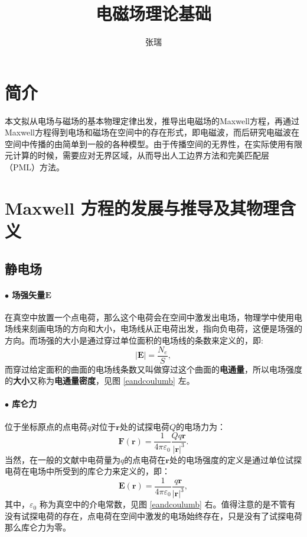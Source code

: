 \documentclass[10pt,reqno, final]{ctexart}
\begin{document}
\title{电磁场理论基础}
\author{张\quad 瑞}
\maketitle
\section{简介}
本文拟从电场与磁场的基本物理定律出发，推导出电磁场的Maxwell方程，再通过Maxwell方程得到电场和磁场在空间中的存在形式，即电磁波，而后研究电磁波在空间中传播的由简单到一般的各种模型。由于传播空间的无界性，在实际使用有限元计算的时候，需要应对无界区域，从而导出人工边界方法和完美匹配层 （PML）方法。

\section{Maxwell 方程的发展与推导及其物理含义}
\subsection{静电场}
\paragraph{$\bullet$ 场强矢量$\bm{E}$}在真空中放置一个点电荷，那么这个电荷会在空间中激发出电场，物理学中使用电场线来刻画电场的方向和大小，电场线从正电荷出发，指向负电荷，这便是场强的方向。而场强的大小是通过穿过单位面积的电场线的条数来定义的，即:
\begin{equation}\label{electricfield}
|\bm{E}|=\frac{N_e}{S},
\end{equation}
而穿过给定面积的曲面的电场线条数又叫做穿过这个曲面的\textbf{电通量}，所以电场强度的\textbf{大小}又称为\textbf{电通量密度}，见图 \ref{eandcoulumb} 左。
\paragraph{$\bullet$ 库仑力}位于坐标原点的点电荷$q$对位于$\bm{r}$处的试探电荷$Q$的电场力为：
\begin{equation}\label{coulombforce}
\bm{F}(\bm{r}) = \frac{1}{4\pi\varepsilon_0}\frac{Qq\bm{r}}{|\bm{r}|^3}.
\end{equation}
当然，在一般的文献中电荷量为$q$的点电荷在$\bm{r}$处的电场强度的定义是通过单位试探电荷在电场中所受到的库仑力来定义的，即：
\begin{equation}\label{columb}
\bm{E}(\bm{r})=\frac{1}{4\pi\varepsilon_0}\frac{q\bm{r}}{|\bm{r}|^3},
\end{equation}
其中，$\varepsilon_0$ 称为真空中的介电常数，见图 \ref{eandcoulumb} 右。值得注意的是不管有没有试探电荷的存在，点电荷在空间中激发的电场始终存在，只是没有了试探电荷那么库仑力为零。
\end{document}
